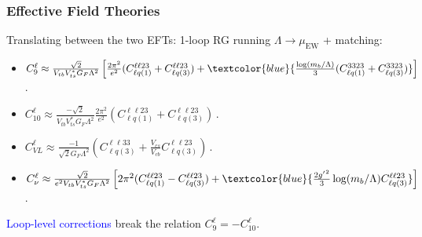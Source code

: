 \documentclass[mathserif, 10pt]{beamer}
\begin{document}
\begin{frame}
  \frametitle{Effective Field Theories}
  Translating between the two EFTs: 1-loop RG running $\Lambda \to \mu_\mathrm{EW}$ + matching:
  \begin{itemize}
    \item {\small $C_9^\ell \approx \frac{\sqrt{2}}{V_{tb}V_{ts}^* G_F \Lambda^2}\left[ \frac{2\pi^2}{e^2}(C_{\ell q(1)}^{\ell\ell23}+C_{\ell q(3)}^{\ell\ell23}) + \textcolor{blue}{\frac{\log(m_b/\Lambda)}{3}(C_{\ell q(1)}^{3323}+C_{\ell q(3)}^{3323})}\right]\, $.}
    \item {\small $C_{10}^\ell \approx \frac{-\sqrt{2}}{V_{tb}V_{ts}^* G_F \Lambda^2} \frac{2\pi^2}{e^2}(C_{\ell q(1)}^{\ell\ell23}+C_{\ell q(3)}^{\ell\ell23}) \, $.}
    \item {\small $C_{VL}^\ell \approx \frac{-1}{\sqrt{2}G_F\Lambda^2}\left(C_{\ell q(3)}^{\ell\ell33}+ \frac{V_{cs}}{V_{cb}}C_{\ell q(3)}^{\ell\ell 23}\right)$\,.}
    \item {\small $C_\nu^\ell \approx \frac{\sqrt{2}}{e^2 V_{tb}V_{ts}^* G_F \Lambda^2}\left[2\pi^2(C_{\ell q(1)}^{\ell\ell 23}-C_{\ell q(3)}^{\ell\ell 23})+\textcolor{blue}{\frac{2{g'}^2}{3}\log(m_b/\Lambda)C_{\ell q(3)}^{\ell\ell 23}}\right]\,$.}
  \end{itemize}

  \textcolor{blue}{Loop-level corrections} break the relation $C_9^\ell = -C_{10}^\ell$.
\end{frame}
\end{document}
